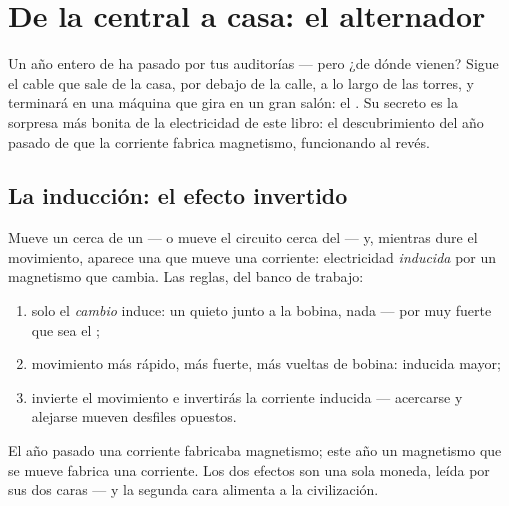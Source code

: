 \chapter{De la central a casa: el alternador}\label{ch:g9:alternator}

Un año entero de  ha pasado por tus auditorías ---
pero ¿de dónde vienen? Sigue el cable que sale de la casa, por debajo
de la calle, a lo largo de las torres, y terminará en una máquina que
gira en un gran salón: el . Su secreto es la sorpresa más
bonita de la electricidad de este libro: el descubrimiento del año
pasado de que la corriente fabrica magnetismo, funcionando al revés.

\section{La inducción: el efecto invertido}

\begin{proposition}\label{prop:g9:alternator:induction}
Mueve un  cerca de un  --- o mueve el
circuito cerca del  --- y, mientras dure el movimiento,
aparece una  que mueve una corriente: electricidad
\emph{inducida} por un magnetismo que cambia. Las reglas, del banco de
trabajo:
\begin{enumerate}
  \item solo el \emph{cambio} induce: un  quieto junto a la
        bobina, nada --- por muy fuerte que sea el ;
  \item movimiento más rápido,  más fuerte, más vueltas de
        bobina:  inducida mayor;
  \item invierte el movimiento e invertirás la corriente inducida
        --- acercarse y alejarse mueven desfiles opuestos.
\end{enumerate}
El año pasado una corriente fabricaba magnetismo; este año un
magnetismo que se mueve fabrica una corriente. Los dos efectos son una
sola moneda, leída por sus dos caras --- y la segunda cara alimenta a la
civilización.
\end{proposition}

